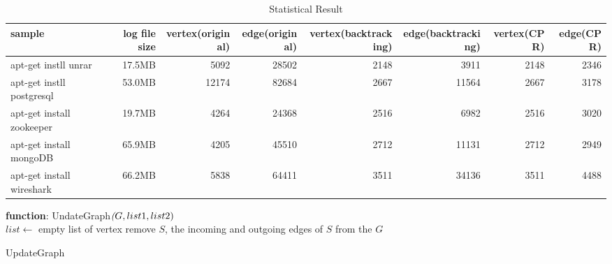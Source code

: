 \begin{table*}[!hp]
	\centering
	\caption{Statistical Result}
	\label{my-label}
	\begin{scriptsize}
		\begin{tabular}{|l|r|r|r|r|r|r|r|}
			\hline
			sample                    & log file size & vertex(original) & edge(original) & vertex(backtracking) & edge(backtracking) & vertex(CPR) & edge(CPR) \\ \hline
			apt-get instll unrar      & 17.5MB        & 5092             & 28502          & 2148                 & 3911               & 2148        & 2346      \\ \hline
			apt-get instll postgresql & 53.0MB        & 12174            & 82684          & 2667                 & 11564              & 2667        & 3178      \\ \hline
			apt-get install zookeeper & 19.7MB        & 4264             & 24368          & 2516                 & 6982               & 2516        & 3020      \\ \hline
			apt-get install mongoDB   & 65.9MB        & 4205             & 45510          & 2712                 & 11131              & 2712        & 2949      \\ \hline
			apt-get install wireshark & 66.2MB        & 5838             & 64411          & 3511                 & 34136              & 3511        & 4488      \\ \hline
		\end{tabular}%
	\end{scriptsize}
	
\end{table*}

\begin{algorithm}

	\textbf{function}: UndateGraph$\textit(G, list1, list2)$\\
	$list \leftarrow$ empty list of vertex\;
	remove $S$, the incoming and outgoing edges of $S$ from the $G$\;
    \caption{UpdateGraph}
	\label{alg:update}
\end{algorithm}



